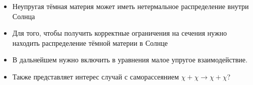 \begin{itemize}
	\item Неупругая тёмная материя может иметь нетермальное распределение внутри Солнца
	\item Для того, чтобы получить корректные ограничения на сечения нужно находить распределение тёмной материи в Солнце
	\item В дальнейшем нужно включить в уравнения малое упругое взаимодействие.
	\item Также представляет интерес случай с саморассеянием $\chi + \chi \rightarrow \chi + \chi$?
	
\end{itemize}